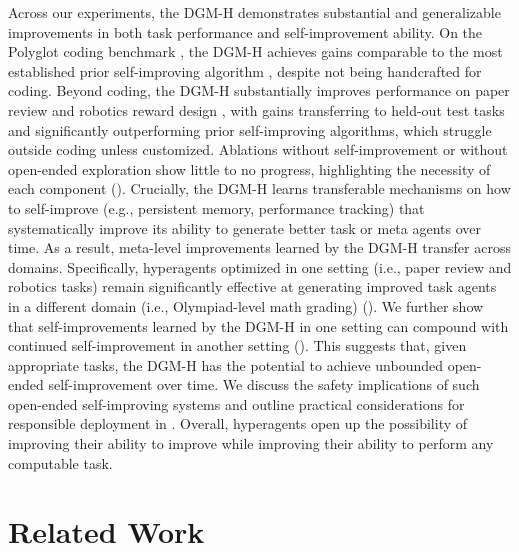\documentclass[]{fairmeta}
\begin{document}
Across our experiments, the DGM-H demonstrates substantial and generalizable improvements in both task performance and self-improvement ability. On the Polyglot coding benchmark \citep{gauthier2024polyglot}, the DGM-H achieves gains comparable to the most established prior self-improving algorithm \citep[the Darwin G\"odel Machine,][]{zhang2025darwin}, despite not being handcrafted for coding. Beyond coding, the DGM-H substantially improves performance on paper review \citep{zhao2026apres} and robotics reward design \citep{genesis2024}, with gains transferring to held-out test tasks and significantly outperforming prior self-improving algorithms, which struggle outside coding unless customized. Ablations without self-improvement or without open-ended exploration show little to no progress, highlighting the necessity of each component (). Crucially, the DGM-H learns transferable mechanisms on how to self-improve (e.g., persistent memory, performance tracking) that systematically improve its ability to generate better task or meta agents over time. As a result, meta-level improvements learned by the DGM-H transfer across domains. Specifically, hyperagents optimized in one setting (i.e., paper review and robotics tasks) remain significantly effective at generating improved task agents in a different domain (i.e., Olympiad-level math grading) (). We further show that self-improvements learned by the DGM-H in one setting can compound with continued self-improvement in another setting (). This suggests that, given appropriate tasks, the DGM-H has the potential to achieve unbounded open-ended self-improvement over time.
We discuss the safety implications of such open-ended self-improving systems and outline practical considerations for responsible deployment in . Overall, hyperagents open up the possibility of improving their ability to improve while improving their ability to perform any computable task.

\section{Related Work}
\label{sec:related-work}
\end{document}
